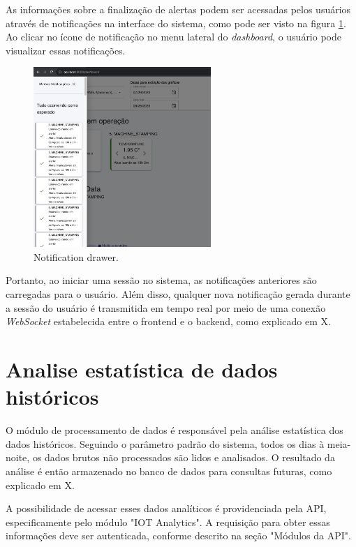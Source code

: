 As informações sobre a finalização de alertas podem ser acessadas pelos usuários através de notificações na interface do sistema, como pode ser visto na figura \ref{fig:notificationDrawer}. Ao clicar no ícone de notificação no menu lateral do \textit{dashboard}, o usuário pode visualizar essas notificações.

\begin{figure}[htbp]
	\centering
	\includegraphics[width=0.6\textwidth]{images/notification.png}
	\caption{Notification drawer.}
	\label{fig:notificationDrawer}
\end{figure}


Portanto, ao iniciar uma sessão no sistema, as notificações anteriores são carregadas para o usuário. Além disso, qualquer nova notificação gerada durante a sessão do usuário é transmitida em tempo real por meio de uma conexão \textit{WebSocket} estabelecida entre o frontend e o backend, como explicado em X.%


\section[Analise estatística de dados históricos]{Analise estatística de dados históricos}\label{sec:histicalGraphs}

O módulo de processamento de dados é responsável pela análise estatística dos dados históricos. Seguindo o parâmetro padrão do sistema, todos os dias à meia-noite, os dados brutos não processados são lidos e analisados. O resultado da análise é então armazenado no banco de dados para consultas futuras, como explicado em X. %

A possibilidade de acessar esses dados analíticos é providenciada pela API, especificamente pelo módulo "IOT Analytics". A requisição para obter essas informações deve ser autenticada, conforme descrito na seção "Módulos da API".%

